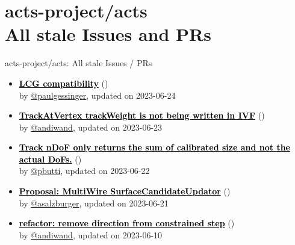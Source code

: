 \section{ acts-project/acts \\ All stale Issues and PRs}
\begin{frame}[allowframebreaks]{ acts-project/acts: All stale Issues / PRs}
  \begin{itemize}
    
    \item\iss\prstale\textbf{\href{https://github.com/acts-project/acts/issues/2054}{\textcolor{black}{LCG compatibility}}}
    (\href{https://github.com/acts-project/acts/issues/2054}{}) \\
    by \href{https://github.com/paulgessinger}{@paulgessinger}, updated on 2023-06-24

    \item\iss\prstale\textbf{\href{https://github.com/acts-project/acts/issues/2149}{\textcolor{black}{TrackAtVertex trackWeight is not being written in IVF}}}
    (\href{https://github.com/acts-project/acts/issues/2149}{}) \\
    by \href{https://github.com/andiwand}{@andiwand}, updated on 2023-06-23

    \item\iss\prstale\textbf{\href{https://github.com/acts-project/acts/issues/2076}{\textcolor{black}{Track nDoF only returns the sum of calibrated size and not the actual DoFs.}}}
    (\href{https://github.com/acts-project/acts/issues/2076}{}) \\
    by \href{https://github.com/pbutti}{@pbutti}, updated on 2023-06-22

    \item\iss\prstale\textbf{\href{https://github.com/acts-project/acts/issues/2063}{\textcolor{black}{Proposal: MultiWire SurfaceCandidateUpdator}}}
    (\href{https://github.com/acts-project/acts/issues/2063}{}) \\
    by \href{https://github.com/asalzburger}{@asalzburger}, updated on 2023-06-21

    \item\propen\prwip\prstale\textbf{\href{https://github.com/acts-project/acts/pull/2073}{\textcolor{black}{refactor: remove direction from constrained step}}}
    (\href{https://github.com/acts-project/acts/pull/2073}{}) \\
    by \href{https://github.com/andiwand}{@andiwand}, updated on 2023-06-10


\end{itemize}
\end{frame}
